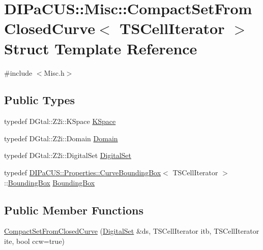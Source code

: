 \hypertarget{structDIPaCUS_1_1Misc_1_1CompactSetFromClosedCurve}{}\section{D\+I\+Pa\+C\+US\+:\+:Misc\+:\+:Compact\+Set\+From\+Closed\+Curve$<$ T\+S\+Cell\+Iterator $>$ Struct Template Reference}
\label{structDIPaCUS_1_1Misc_1_1CompactSetFromClosedCurve}


{\ttfamily \#include $<$Misc.\+h$>$}

\subsection*{Public Types}
\begin{DoxyCompactItemize}
\item 
typedef D\+Gtal\+::\+Z2i\+::\+K\+Space \mbox{\hyperlink{structDIPaCUS_1_1Misc_1_1CompactSetFromClosedCurve_ae0abf12acccdd86815be164230d55500}{K\+Space}}
\item 
typedef D\+Gtal\+::\+Z2i\+::\+Domain \mbox{\hyperlink{structDIPaCUS_1_1Misc_1_1CompactSetFromClosedCurve_ae2c31e3a7c2fe1d68612d5255eac221b}{Domain}}
\item 
typedef D\+Gtal\+::\+Z2i\+::\+Digital\+Set \mbox{\hyperlink{structDIPaCUS_1_1Misc_1_1CompactSetFromClosedCurve_a47e3100b4196961a629785d14f6ad645}{Digital\+Set}}
\item 
typedef \mbox{\hyperlink{structDIPaCUS_1_1Properties_1_1CurveBoundingBox}{D\+I\+Pa\+C\+U\+S\+::\+Properties\+::\+Curve\+Bounding\+Box}}$<$ T\+S\+Cell\+Iterator $>$\+::\mbox{\hyperlink{structDIPaCUS_1_1Misc_1_1CompactSetFromClosedCurve_abf35d4316dab4c7f1b2dd2e3b0f6115f}{Bounding\+Box}} \mbox{\hyperlink{structDIPaCUS_1_1Misc_1_1CompactSetFromClosedCurve_abf35d4316dab4c7f1b2dd2e3b0f6115f}{Bounding\+Box}}
\end{DoxyCompactItemize}
\subsection*{Public Member Functions}
\begin{DoxyCompactItemize}
\item 
\mbox{\hyperlink{structDIPaCUS_1_1Misc_1_1CompactSetFromClosedCurve_a1658703bdaf299c6a876b45f937cab5d}{Compact\+Set\+From\+Closed\+Curve}} (\mbox{\hyperlink{structDIPaCUS_1_1Misc_1_1CompactSetFromClosedCurve_a47e3100b4196961a629785d14f6ad645}{Digital\+Set}} \&ds, T\+S\+Cell\+Iterator itb, T\+S\+Cell\+Iterator ite, bool ccw=true)
\end{DoxyCompactItemize}


